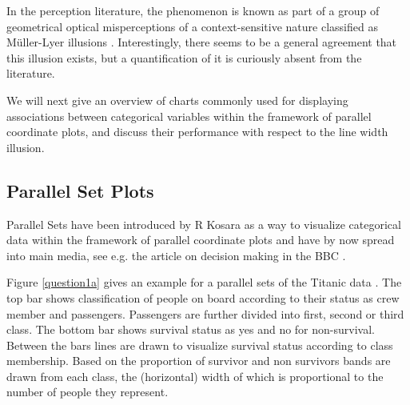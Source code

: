 In the perception literature, the phenomenon is known as part of a group of geometrical optical misperceptions of a context-sensitive nature classified as M\"uller-Lyer illusions \citep{day:1991}. Interestingly, there seems to be a general agreement that this illusion exists, but a quantification of it is curiously absent from the literature.
%
%

We will next give an overview of  charts commonly used for displaying associations between categorical variables within the framework of parallel coordinate plots, and discuss their performance with respect to the line width illusion.


\subsection{Parallel Set Plots}


Parallel Sets have been introduced by R Kosara \citep{kosara:2006} as a way to visualize categorical data within the framework of parallel coordinate plots  and have by now spread into main media, see e.g. the article on decision making in the BBC \citep{bbc:2009}. 

Figure \ref{question1a} gives an example for a parallel sets of the Titanic data \citep{dawson:1995}. The top bar shows classification of people on board according to their status as crew member and passengers. Passengers are further divided into first, second or third class. The bottom bar shows survival status as yes and no for non-survival. Between the bars lines are drawn to visualize survival status according to class membership. Based on the proportion of survivor and non survivors bands are drawn from each class, the (horizontal) width of which is proportional to the number of people they represent. 

